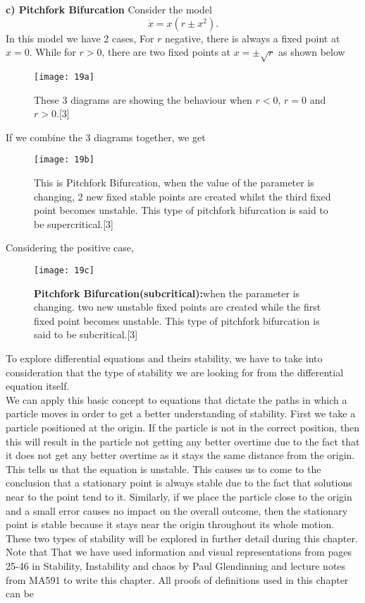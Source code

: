 \documentclass[a4paper]{report}
\theoremstyle{definition}
\begin{document}
\textbf{c) Pitchfork Bifurcation}
Consider the model
\begin{equation}
\label{equ:3.63}
\dot{x}=x(r \pm x^2).
\end{equation}
In this model we have 2 cases,
\newline
For $r$ negative, there is always a fixed point at $x=0$. While for $r>0$, there are two fixed points at $x=\pm \sqrt{r}$ as shown below
\begin{figure}[H]
\texttt{[image: 19a]}
\caption{These 3 diagrams are showing the behaviour when $r<0$, $r=0$ and $r>0$.[3]}
\label{fig:figure34}
\end{figure}
If we combine the 3 diagrams together, we get
\begin{figure}[H]
\texttt{[image: 19b]}
\caption{This is Pitchfork Bifurcation, when the value of the parameter is changing, 2 new fixed stable points are created whilst the third fixed point becomes unstable. This type of pitchfork bifurcation is said to be supercritical.[3]}
\label{fig:figure34}
\end{figure}
Considering the positive case,

\begin{figure}[H]
\centering
\texttt{[image: 19c]}
\caption{\textbf{Pitchfork Bifurcation(subcritical):}when the parameter is changing. two new unstable fixed points are created while the first fixed point becomes unstable. This type of pitchfork bifurcation is said to be subcritical.[3]}
\label{fig:figure34}
\end{figure}

To explore differential equations and theirs stability, we have to take into consideration that the type of stability we are looking for from the differential equation itself. \\
We can apply this basic concept to equations that dictate the paths in which a particle moves in order to get a better understanding of stability. First we take a particle positioned at the origin. If the particle is not in the correct position, then this will result in the particle not getting any better overtime due to the fact that it does not get any better overtime as it stays the same distance from the origin. This tells us that the equation is unstable. This causes us to come to the conclusion that a stationary point is always stable due to the fact that solutions near to the point tend to it. Similarly, if we place the particle close to the origin and a small error causes no impact on the overall outcome, then the stationary point is stable because it stays near the origin throughout its whole motion. These two types of stability will be explored in further detail during this chapter. 
\newline
Note that That we have used information and visual representations from pages 25-46 in Stability, Instability and chaos by Paul Glendinning and lecture notes from MA591 to write this chapter.  All proofs of definitions used in this chapter can be 
\end{document}
